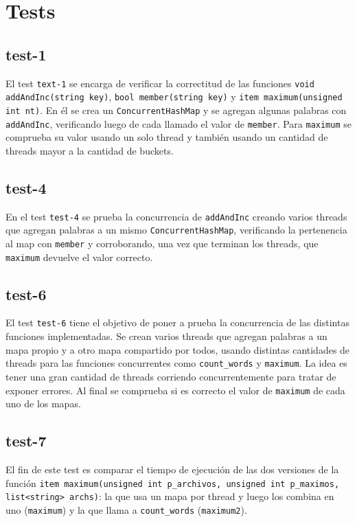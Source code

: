 \section{Tests}


\subsection{test-1}

El test \texttt{text-1} se encarga de verificar la correctitud de las funciones \texttt{void addAndInc(string key)}, \texttt{bool member(string key)} y \texttt{item maximum(unsigned int nt)}. En él se crea un \texttt{ConcurrentHashMap} y se agregan algunas palabras con \texttt{addAndInc}, verificando luego de cada llamado el valor de \texttt{member}. Para \texttt{maximum} se comprueba su valor usando un solo thread y también usando un cantidad de threads mayor a la cantidad de buckets.


\subsection{test-4}

En el test \texttt{test-4} se prueba la concurrencia de \texttt{addAndInc} creando varios threads que agregan palabras a un mismo \texttt{ConcurrentHashMap}, verificando la pertenencia al map con \texttt{member} y corroborando, una vez que terminan los threads, que \texttt{maximum} devuelve el valor correcto.


\subsection{test-6}

El test \texttt{test-6} tiene el objetivo de poner a prueba la concurrencia de las distintas funciones implementadas. Se crean varios threads que agregan palabras a un mapa propio y a otro mapa compartido por todos, usando distintas cantidades de threads para las funciones concurrentes como \texttt{count\_words} y \texttt{maximum}. La idea es tener una gran cantidad de threads corriendo concurrentemente para tratar de exponer errores. Al final se comprueba si es correcto el valor de \texttt{maximum} de cada uno de los mapas.


\subsection{test-7}

El fin de este test es comparar el tiempo de ejecución de las dos versiones de la función \texttt{item maximum(unsigned int p_archivos, unsigned int p_maximos, list<string> archs)}: la que usa un mapa por thread y luego los combina en uno (\texttt{maximum}) y la que llama a \texttt{count\_words} (\texttt{maximum2}).


